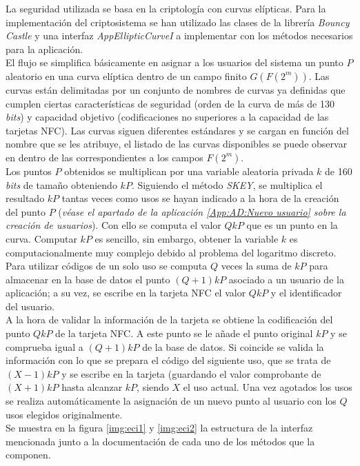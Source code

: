 \documentclass[../PFC.tex]{subfiles}
\begin{document}
La seguridad utilizada se basa en la criptología con curvas elípticas. Para la implementación del criptosistema se han utilizado las clases de la librería \textit{Bouncy Castle} y una interfaz \textit{AppEllipticCurveI} a implementar con los métodos necesarios para la aplicación.
\*
\vspace{0.5515cm}
\\
El flujo se simplifica básicamente en asignar a los usuarios del sistema un punto $P$ aleatorio en una curva elíptica dentro de un campo finito $G(F(2^m))$. Las curvas están delimitadas por un conjunto de nombres de curvas ya definidas que cumplen ciertas características de seguridad (orden de la curva de más de 130 \textit{bits}) y capacidad objetivo (codificaciones no superiores a la capacidad de las tarjetas NFC). Las curvas siguen diferentes estándares y se cargan en función del nombre que se les atribuye, el listado de las curvas disponibles se puede observar en \cite{bouncyCastleCurves} dentro de las correspondientes a los campos $F(2^m)$.
\*
\vspace{0.5515cm}
\\
Los puntos $P$ obtenidos se multiplican por una variable aleatoria privada $k$ de 160 \textit{bits} de tamaño obteniendo $kP$. Siguiendo el método \textit{SKEY}, se multiplica el resultado $kP$ tantas veces como usos se hayan indicado a la hora de la creación del punto $P$ (\textit{véase el apartado de la aplicación \ref{App:AD:Nuevo usuario} sobre la creación de usuarios}). Con ello se computa el valor $QkP$ que es un punto en la curva. Computar $kP$ es sencillo, sin embargo, obtener la variable $k$ es computacionalmente muy complejo debido al problema del logaritmo discreto. Para utilizar códigos de un solo uso se computa $Q$ veces la suma de $kP$ para almacenar en la base de datos el punto $(Q+1)kP$ asociado a un usuario de la aplicación; a su vez, se escribe en la tarjeta NFC el valor $QkP$ y el identificador del usuario.
\*
\vspace{0.5515cm}
\\
A la hora de validar la información de la tarjeta se obtiene la codificación del punto $QkP$ de la tarjeta NFC. A este punto se le añade el punto original $kP$ y se comprueba igual a $(Q+1)kP$ de la base de datos. Si coincide se valida la información con lo que se prepara el código del siguiente uso, que se trata de $(X-1)kP$ y se escribe en la tarjeta (guardando el valor comprobante de $(X+1)kP$ hasta alcanzar $kP$, siendo $X$ el uso actual. Una vez agotados los usos se realiza automáticamente la asignación de un nuevo punto al usuario con los $Q$ usos elegidos originalmente.
\*
\vspace{0.5515cm}
\\
Se muestra en la figura \ref{img:eci1} y \ref{img:eci2} la estructura de la interfaz mencionada junto a la documentación de cada uno de los métodos que la componen.
 
\end{document}
